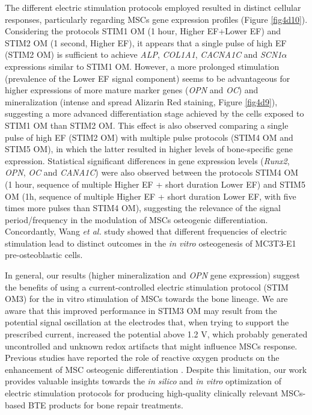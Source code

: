 The different electric stimulation protocols employed resulted in distinct cellular responses, particularly regarding \ac{MSCs} gene expression profiles (Figure \ref{fig4d10}). Considering the protocols STIM1 OM (1 hour, Higher \ac{EF}+Lower \ac{EF}) and STIM2 OM (1 second, Higher \ac{EF}), it appears that a single pulse of high \ac{EF} (STIM2 OM) is sufficient to achieve \textit{ALP}, \textit{COL1A1}, \textit{CACNA1C} and \textit{SCN1$\alpha$} expressions similar to STIM1 OM. However, a more prolonged stimulation (prevalence of the Lower \ac{EF} signal component) seems to be advantageous for higher expressions of more mature marker genes (\textit{OPN} and \textit{OC}) and mineralization (intense and spread Alizarin Red staining, Figure \ref{fig4d9}), suggesting a more advanced differentiation stage achieved by the cells exposed to STIM1 OM than STIM2 OM. This effect is also observed comparing a single pulse of high \ac{EF} (STIM2 OM) with multiple pulse protocols (STIM4 OM and STIM5 OM), in which the latter resulted in higher levels of bone-specific gene expression. Statistical significant differences in gene expression levels (\textit{Runx2}, \textit{OPN}, \textit{OC} and \textit{CANA1C}) were also observed between the protocols STIM4 OM (1 hour, sequence of multiple Higher \ac{EF} + short duration Lower \ac{EF}) and STIM5 OM (1h, sequence of multiple Higher \ac{EF} + short duration Lower \ac{EF}, with five times more pulses than STIM4 OM), suggesting the relevance of the signal period/frequency in the modulation of \ac{MSCs} osteogenic differentiation. Concordantly, Wang \textit{et al.} \cite{Wang2016-ff} study showed that different frequencies of electric stimulation lead to distinct outcomes in the \textit{in vitro} osteogenesis of MC3T3-E1 pre-osteoblastic cells.

In general, our results (higher mineralization and \textit{OPN} gene expression) suggest the benefits of using a current-controlled electric stimulation protocol (STIM OM3) for the in vitro stimulation of \ac{MSCs} towards the bone lineage. We are aware that this improved performance in STIM3 OM may result from the potential signal oscillation at the electrodes that, when trying to support the prescribed current, increased the potential above 1.2 \si{\volt}, which probably generated uncontrolled and unknown redox artifacts that might influence \ac{MSCs} response. Previous studies have reported the role of reactive oxygen products on the enhancement of MSC osteogenic differentiation \cite{Srirussamee2021-cj, Sheppard2022-gj}. Despite this limitation, our work provides valuable insights towards the \textit{in silico} and \textit{in vitro} optimization of electric stimulation protocols for producing high-quality clinically relevant \ac{MSCs}-based \ac{BTE} products for bone repair treatments.

